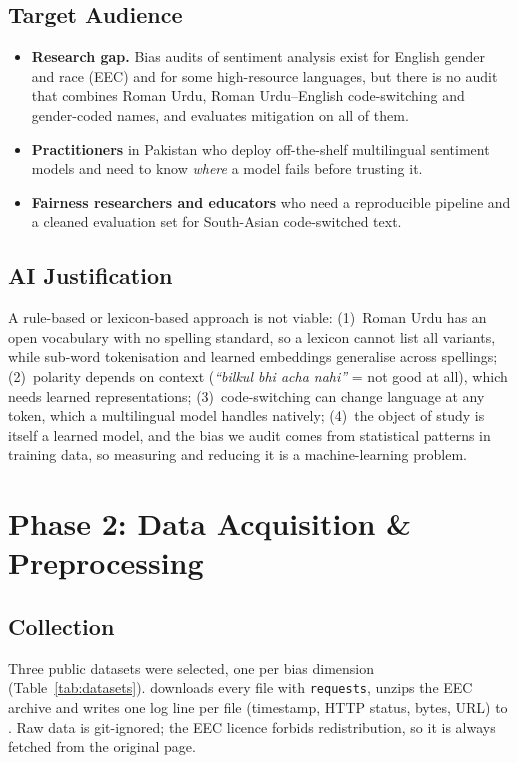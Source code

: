 \documentclass[11pt,a4paper]{article}
\begin{document}
\subsection{Target Audience}
\begin{itemize}
  \item \textbf{Research gap.} Bias audits of sentiment analysis exist for English gender and
        race (EEC) and for some high-resource languages, but there is no audit that combines
        Roman Urdu, Roman Urdu--English code-switching and gender-coded names, and evaluates
        mitigation on all of them.
  \item \textbf{Practitioners} in Pakistan who deploy off-the-shelf multilingual sentiment
        models and need to know \emph{where} a model fails before trusting it.
  \item \textbf{Fairness researchers and educators} who need a reproducible pipeline and a
        cleaned evaluation set for South-Asian code-switched text.
\end{itemize}

\subsection{AI Justification}
A rule-based or lexicon-based approach is not viable: (1)~Roman Urdu has an open vocabulary
with no spelling standard, so a lexicon cannot list all variants, while sub-word tokenisation
and learned embeddings generalise across spellings; (2)~polarity depends on context
(\emph{``bilkul bhi acha nahi''} = not good at all), which needs learned representations;
(3)~code-switching can change language at any token, which a multilingual model handles
natively; (4)~the object of study is itself a learned model, and the bias we audit comes from
statistical patterns in training data, so measuring and reducing it is a machine-learning
problem.

\section{Phase 2: Data Acquisition \& Preprocessing}

\subsection{Collection}
Three public datasets were selected, one per bias dimension (Table~\ref{tab:datasets}).
 downloads every file with \texttt{requests}, unzips the
EEC archive and writes one log line per file (timestamp, HTTP status, bytes, URL) to
. Raw data is git-ignored; the EEC licence forbids
redistribution, so it is always fetched from the original page.
\end{document}
